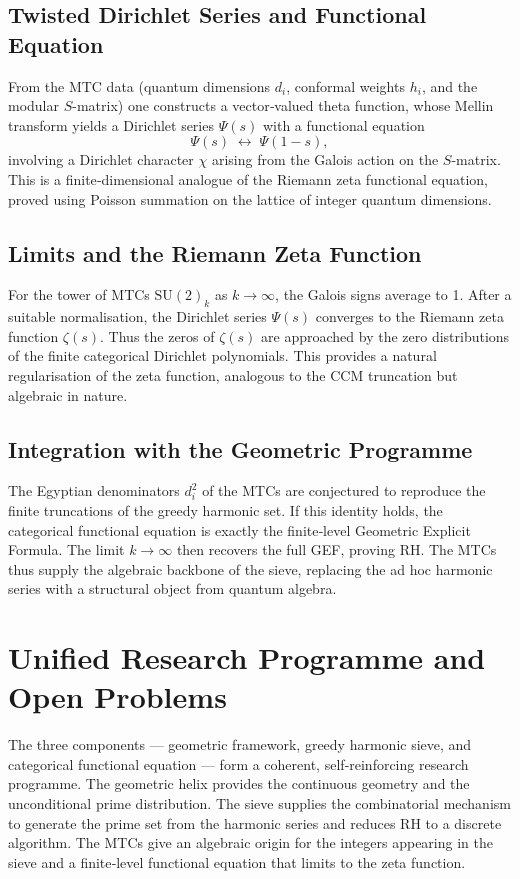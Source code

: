 \documentclass[12pt,a4paper,twoside]{book}
\begin{document}
\section{Twisted Dirichlet Series and Functional Equation}
From the MTC data (quantum dimensions \(d_i\), conformal weights \(h_i\), and the modular \(S\)-matrix) one constructs a vector‑valued theta function, whose Mellin transform yields a Dirichlet series \(\Psi(s)\) with a functional equation
\[
\Psi(s) \;\longleftrightarrow\; \Psi(1-s),
\]
involving a Dirichlet character \(\chi\) arising from the Galois action on the \(S\)-matrix.  This is a finite‑dimensional analogue of the Riemann zeta functional equation, proved using Poisson summation on the lattice of integer quantum dimensions.

\section{Limits and the Riemann Zeta Function}
For the tower of MTCs \(\mathrm{SU}(2)_k\) as \(k\to\infty\), the Galois signs average to 1.  After a suitable normalisation, the Dirichlet series \(\Psi(s)\) converges to the Riemann zeta function \(\zeta(s)\).  Thus the zeros of \(\zeta(s)\) are approached by the zero distributions of the finite categorical Dirichlet polynomials.  This provides a natural regularisation of the zeta function, analogous to the CCM truncation but algebraic in nature.

\section{Integration with the Geometric Programme}
The Egyptian denominators \(d_i^2\) of the MTCs are conjectured to reproduce the finite truncations of the greedy harmonic set.  If this identity holds, the categorical functional equation is exactly the finite‑level Geometric Explicit Formula.  The limit \(k\to\infty\) then recovers the full GEF, proving RH.  The MTCs thus supply the algebraic backbone of the sieve, replacing the ad hoc harmonic series with a structural object from quantum algebra.

\chapter{Unified Research Programme and Open Problems}

The three components — geometric framework, greedy harmonic sieve, and categorical functional equation — form a coherent, self‑reinforcing research programme.  The geometric helix provides the continuous geometry and the unconditional prime distribution.  The sieve supplies the combinatorial mechanism to generate the prime set from the harmonic series and reduces RH to a discrete algorithm.  The MTCs give an algebraic origin for the integers appearing in the sieve and a finite‑level functional equation that limits to the zeta function.
\end{document}
